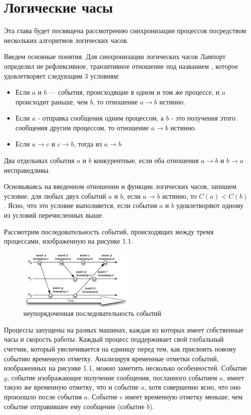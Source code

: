 \chapter{Логические часы}
\label{sec:examples}
Эта глава будет посвящена рассмотрению синхронизации процессов посредством нескольких алгоритмов логических часов.\par
Введем основные понятия. 
Для синхронизации логических часов Лампорт определил  не рефлексивное, транзитивное отношение под названием , которое удовлетворяет следующим 3 условиям: 
\begin{itemize}
\item Если $a$ и $b$ — события, происходящие в одном и том же процессе, и $a$
           происходит раньше, чем $b$, то отношение $a \rightarrow b$ истинно.
\item Если $a$ - отправка сообщения одним процессом, а $b$ - это получения этого сообщения другим процессом, то отношение $a \rightarrow b$ истинно.
\item Если $a \rightarrow c$ и $c \rightarrow b$, тогда из $a \rightarrow b$
\end{itemize}
Два отдельных события $a$ и $b$ конкурентные, если оба отношения $a \rightarrow b$ и $b \rightarrow a$ несправедливы. \par
Основываясь на введенном отношении и функции логических часов, запишем условие:
для любых двух событий $a$ и $b$, если $a \rightarrow b$ истинно, то $C(a) < C(b)$. Ясно, что это условие выполняется, если  события $a$ и $b$ удовлетворяют одному из условий перечисленных выше. \par
Рассмотрим последовательность событий, происходящих между тремя процессами, изображенную на рисунке 1.1.
\begin{figure}
\centering

\includegraphics[width=0.5\textwidth]{img/lamport1.png}
\caption{неупорядоченная последовательность событий}
\end{figure}
Процессы запущены на разных машинах, каждая из которых имеет собственные часы и скорость работы. Каждый процесс поддерживает свой глобальный счетчик, который увеличивается на единицу перед тем, как присвоить новому событию временную отметку. Анализируя временные отметки событий, изображенных на рисунке 1.1, можно заметить несколько особенностей. Событие $g$, событие изображающее получение сообщения, посланного событием $a$, имеет такую же временную отметку, что и событие $a$, хотя совершенно ясно, что оно произошло после события $a$. Событие $e$ имеет  временную отметку меньше, чем событие отправившее ему сообщение (событие $b$).

